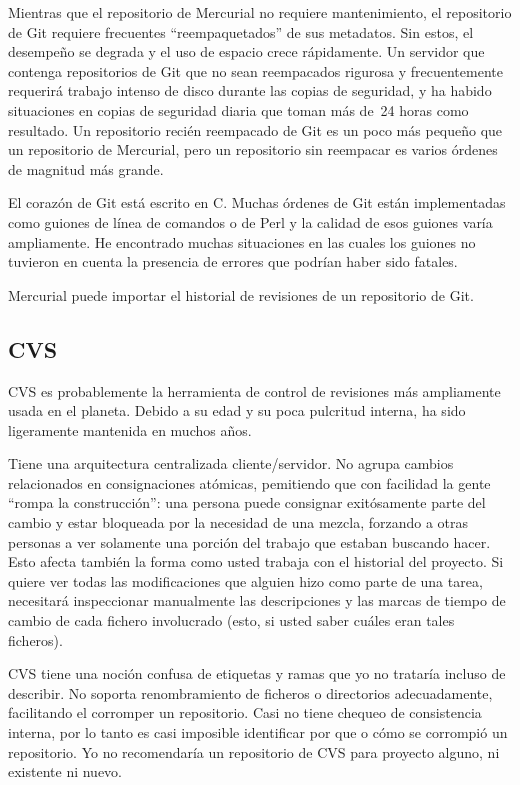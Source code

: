Mientras que el repositorio de Mercurial no requiere mantenimiento, el
repositorio de Git requiere frecuentes ``reempaquetados'' de sus metadatos.
Sin estos, el desempeño se degrada y el uso de espacio crece rápidamente. Un
servidor que contenga repositorios de Git que no sean reempacados
rigurosa y frecuentemente requerirá trabajo intenso de disco durante
las copias de seguridad, y ha habido situaciones en copias de
seguridad diaria que toman más de~24 horas como resultado. Un
repositorio recién reempacado de Git es un poco más pequeño que un
repositorio de Mercurial, pero un repositorio sin reempacar es varios
órdenes de magnitud más grande.

El corazón de Git está escrito en C.  Muchas órdenes de Git están
implementadas como guiones de línea de comandos o de Perl y la calidad de esos
guiones varía ampliamente. He encontrado muchas situaciones en las
cuales los guiones no tuvieron en cuenta la presencia de errores que
podrían haber sido fatales.

Mercurial puede importar el historial de revisiones de un repositorio
de Git.

\subsection{CVS}

CVS es probablemente la herramienta de control de revisiones más
ampliamente usada en el planeta.  Debido a su edad y su poca pulcritud
interna, ha sido ligeramente mantenida en muchos años.

Tiene una arquitectura centralizada cliente/servidor. No agrupa
cambios relacionados en consignaciones atómicas, pemitiendo que con
facilidad la gente ``rompa la construcción'': una persona puede
consignar exitósamente parte del cambio y estar bloqueada por la
necesidad de una mezcla, forzando a otras personas a ver solamente una
porción del trabajo que estaban buscando hacer.  Esto afecta también
la forma como usted trabaja con el historial del proyecto. Si quiere
ver todas las modificaciones que alguien hizo como parte de una tarea,
necesitará inspeccionar manualmente las descripciones y las marcas de
tiempo de cambio de cada fichero involucrado (esto, si usted saber
cuáles eran tales ficheros).

CVS tiene una noción confusa de etiquetas y ramas que yo no trataría
incluso de describir.  No soporta renombramiento de ficheros o
directorios adecuadamente, facilitando el corromper un
repositorio. Casi no tiene chequeo de consistencia interna, por lo
tanto es casi imposible identificar por que o cómo se corrompió un
repositorio. Yo no recomendaría un repositorio de CVS para proyecto
alguno, ni existente ni nuevo.

